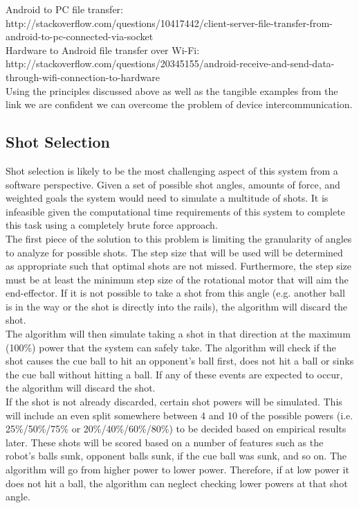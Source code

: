 \documentclass[titlepage]{article}
\begin{document}
Android to PC file transfer:\\
http://stackoverflow.com/questions/10417442/client-server-file-transfer-from-android-to-pc-connected-via-socket\\

Hardware to Android file transfer over Wi-Fi:\\
http://stackoverflow.com/questions/20345155/android-receive-and-send-data-through-wifi-connection-to-hardware\\

Using the principles discussed above as well as the tangible examples from the link we are confident we can overcome the problem of device intercommunication.

\subsection{Shot Selection}
Shot selection is likely to be the most challenging aspect of this system from a software perspective. Given a set of possible shot angles, amounts of force, and weighted goals the system would need to simulate a multitude of shots. It is infeasible given the computational time requirements of this system to complete this task using a completely brute force approach.\\

The first piece of the solution to this problem is limiting the granularity of angles to analyze for possible shots. The step size that will be used will be determined as appropriate such that optimal shots are not missed. Furthermore, the step size must be at least the minimum step size of the rotational motor that will aim the end-effector. If it is not possible to take a shot from this angle (e.g. another ball is in the way or the shot is directly into the rails), the algorithm will discard the shot.\\

The algorithm will then simulate taking a shot in that direction at the maximum (100\%) power that the system can safely take. The algorithm will check if the shot causes the cue ball to hit an opponent's ball first, does not hit a ball or sinks the cue ball without hitting a ball. If any of these events are expected to occur, the algorithm will discard the shot.\\

If the shot is not already discarded, certain shot powers will be simulated. This will include an even split somewhere between 4 and 10 of the possible powers (i.e. 25\%/50\%/75\% or 20\%/40\%/60\%/80\%) to be decided based on empirical results later. These shots will be scored based on a number of features such as the robot's balls sunk, opponent balls sunk, if the cue ball was sunk, and so on. The algorithm will go from higher power to lower power. Therefore, if at low power it does not hit a ball, the algorithm can neglect checking lower powers at that shot angle.\\
\end{document}
